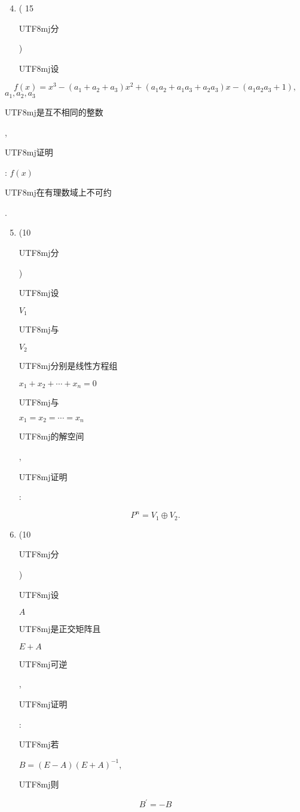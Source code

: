 \documentclass[10pt]{article}
\begin{document}
\begin{enumerate}
  \setcounter{enumi}{3}
  \item ( 15 \begin{CJK}{UTF8}{mj}分\end{CJK}) \begin{CJK}{UTF8}{mj}设\end{CJK}
\end{enumerate}
$$
f(x)=x^{3}-\left(a_{1}+a_{2}+a_{3}\right) x^{2}+\left(a_{1} a_{2}+a_{1} a_{3}+a_{2} a_{3}\right) x-\left(a_{1} a_{2} a_{3}+1\right),
$$
$a_{1}, a_{2}, a_{3}$ \begin{CJK}{UTF8}{mj}是互不相同的整数\end{CJK}, \begin{CJK}{UTF8}{mj}证明\end{CJK}: $f(x)$ \begin{CJK}{UTF8}{mj}在有理数域上不可约\end{CJK}.

\begin{enumerate}
  \setcounter{enumi}{4}
  \item (10 \begin{CJK}{UTF8}{mj}分\end{CJK}) \begin{CJK}{UTF8}{mj}设\end{CJK} $V_{1}$ \begin{CJK}{UTF8}{mj}与\end{CJK} $V_{2}$ \begin{CJK}{UTF8}{mj}分别是线性方程组\end{CJK} $x_{1}+x_{2}+\cdots+x_{n}=0$ \begin{CJK}{UTF8}{mj}与\end{CJK} $x_{1}=x_{2}=\cdots=x_{n}$ \begin{CJK}{UTF8}{mj}的解空间\end{CJK}, \begin{CJK}{UTF8}{mj}证明\end{CJK}:
\end{enumerate}
$$
P^{n}=V_{1} \oplus V_{2} .
$$

\begin{enumerate}
  \setcounter{enumi}{5}
  \item (10 \begin{CJK}{UTF8}{mj}分\end{CJK}) \begin{CJK}{UTF8}{mj}设\end{CJK} $A$ \begin{CJK}{UTF8}{mj}是正交矩阵且\end{CJK} $E+A$ \begin{CJK}{UTF8}{mj}可逆\end{CJK}, \begin{CJK}{UTF8}{mj}证明\end{CJK}: \begin{CJK}{UTF8}{mj}若\end{CJK} $B=(E-A)(E+A)^{-1}$, \begin{CJK}{UTF8}{mj}则\end{CJK}
\end{enumerate}
$$
B^{\prime}=-B
$$
\end{document}
